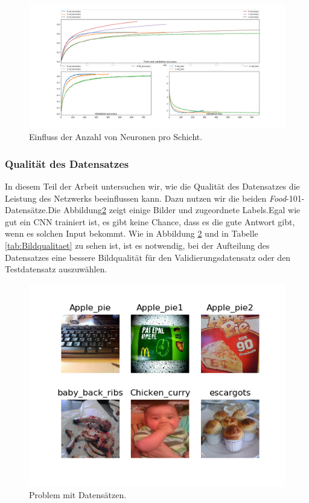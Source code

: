 \documentclass[12pt,a4paper]{scrartcl}
\numberwithin{equation}{section}
\begin{document}
\begin{figure}[h]
	\centering
	\includegraphics[width=\textwidth]{units}
	\caption{Einfluss der Anzahl von Neuronen pro Schicht.}
	\label{fig:units}
\end{figure}



\subsubsection{Qualität des Datensatzes}
In diesem Teil der Arbeit untersuchen wir, wie die Qualität des Datensatzes die Leistung des Netzwerks beeinflussen kann. Dazu nutzen wir die beiden \textit{Food}-101-Datensätze.Die Abbildung\ref{fig:Dataset_problem} zeigt einige Bilder und zugeordnete Labels.Egal wie gut ein \ac{CNN} trainiert ist, es gibt keine Chance, dass es die gute Antwort gibt, wenn es solchen Input bekommt.  Wie in Abbildung \ref{fig:Dataset_problem} und in Tabelle \ref{tab:Bildqualitaet} zu sehen ist, ist es notwendig, bei der Aufteilung des Datensatzes eine bessere Bildqualität für den Validierungsdatensatz oder den Testdatensatz auszuwählen.

\begin{figure}[ht]
	\centering
	\includegraphics[width=\textwidth]{Dataset_problem}
	\caption{Problem mit Datensätzen.}
	\label{fig:Dataset_problem}
\end{figure}
\end{document}
